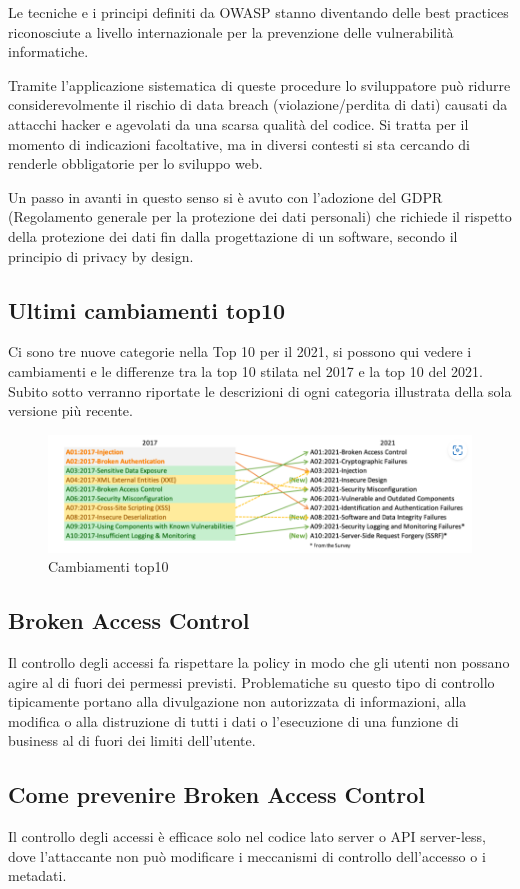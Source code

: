Le tecniche e i principi definiti da OWASP stanno diventando delle best practices riconosciute a livello internazionale per la prevenzione delle vulnerabilità informatiche.

Tramite l’applicazione sistematica di queste procedure lo sviluppatore può ridurre considerevolmente il rischio di data breach (violazione/perdita di dati) causati da attacchi hacker e agevolati da una scarsa qualità del codice.
Si tratta per il momento di indicazioni facoltative, ma in diversi contesti si sta cercando di renderle obbligatorie per lo sviluppo web.

Un passo in avanti in questo senso si è avuto con l’adozione del GDPR (Regolamento generale per la protezione dei dati personali) che richiede il rispetto della protezione dei dati fin dalla progettazione di un software, secondo il principio di privacy by design.
\subsection{Ultimi cambiamenti top10} 
\cite{Top10}
Ci sono tre nuove categorie nella Top 10 per il 2021, si possono qui vedere i cambiamenti e le differenze tra la top 10 stilata nel 2017 e la top 10 del 2021.
Subito sotto verranno riportate le descrizioni di ogni categoria illustrata della sola versione più recente.
\begin{figure}[H]
    \centering
    \includegraphics[scale=0.8]{Immagini/img3.png}
    \caption{Cambiamenti top10}
    \label{fig:cambiamentiTop10}
\end{figure}
\subsection{Broken Access Control} 
Il controllo degli accessi fa rispettare la policy in modo che gli utenti non possano agire al di fuori dei permessi previsti. Problematiche su questo tipo di controllo tipicamente portano alla divulgazione non autorizzata di informazioni, alla modifica o alla distruzione di tutti i dati o l'esecuzione di una funzione di business al di fuori dei limiti dell'utente. 
\subsection{Come prevenire Broken Access Control}
Il controllo degli accessi è efficace solo nel codice lato server o API server-less, dove l'attaccante non può modificare i meccanismi di controllo dell'accesso o i metadati.


